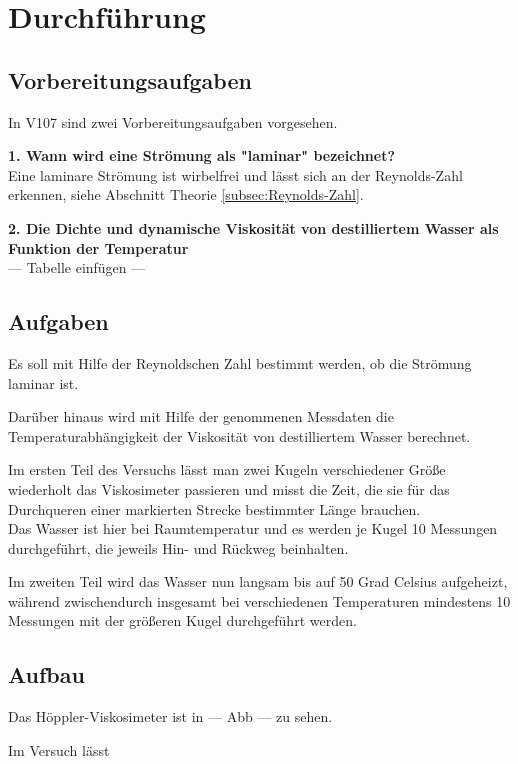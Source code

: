 \section{Durchführung}
\label{sec:Durchführung}

\subsection{Vorbereitungsaufgaben}

In V107 sind zwei Vorbereitungsaufgaben vorgesehen.

\textbf{1. Wann wird eine Strömung als "laminar" bezeichnet?} \\
Eine laminare Strömung ist wirbelfrei und lässt sich an der Reynolds-Zahl erkennen, siehe Abschnitt 
Theorie \ref{subsec:Reynolds-Zahl}.



\textbf{2. Die Dichte und dynamische Viskosität von destilliertem Wasser als Funktion der Temperatur}\\
 --- Tabelle einfügen ---




\subsection{Aufgaben}
\label{subsec:Aufgaben}

Es soll mit Hilfe der Reynoldschen Zahl bestimmt werden, ob die Strömung laminar ist.

Darüber hinaus wird mit Hilfe der genommenen Messdaten die Temperaturabhängigkeit der Viskosität von
destilliertem Wasser berechnet. 

Im ersten Teil des Versuchs lässt man zwei Kugeln verschiedener Größe wiederholt das Viskosimeter 
passieren und misst die Zeit, die sie für das Durchqueren einer markierten Strecke bestimmter Länge brauchen. \\
Das Wasser ist hier bei Raumtemperatur und es werden je Kugel 10 Messungen durchgeführt, die jeweils Hin- und Rückweg 
beinhalten.

Im zweiten Teil wird das Wasser nun langsam bis auf 50 Grad Celsius aufgeheizt, während zwischendurch 
insgesamt bei verschiedenen Temperaturen mindestens 10 Messungen mit der größeren Kugel durchgeführt werden. 




\subsection{Aufbau}
\label{subsec:Aufbau}

Das Höppler-Viskosimeter ist in --- Abb --- zu sehen.

Im Versuch lässt 